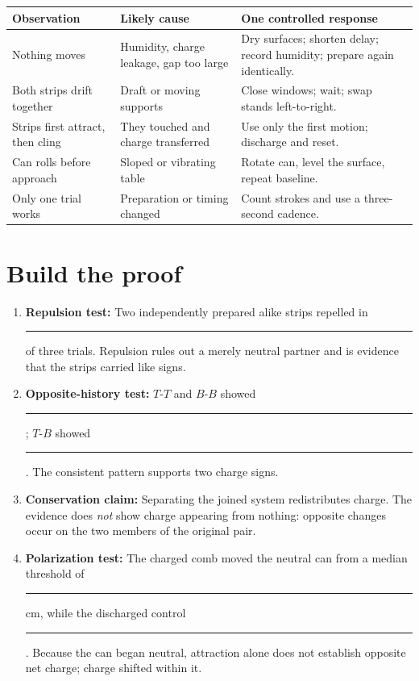 \begin{tabularx}{\linewidth}{@{}p{.24\linewidth}L L@{}}
\toprule
Observation & Likely cause & One controlled response\\
\midrule
Nothing moves & Humidity, charge leakage, gap too large & Dry surfaces; shorten
delay; record humidity; prepare again identically.\\
Both strips drift together & Draft or moving supports & Close windows; wait;
swap stands left-to-right.\\
Strips first attract, then cling & They touched and charge transferred & Use
only the first motion; discharge and reset.\\
Can rolls before approach & Sloped or vibrating table & Rotate can, level the
surface, repeat baseline.\\
Only one trial works & Preparation or timing changed & Count strokes and use a
three-second cadence.\\
\bottomrule
\end{tabularx}

\section{Build the proof}

\begin{enumerate}
  \item \textbf{Repulsion test:} Two independently prepared alike strips
    repelled in \rule{1cm}{.3pt} of three trials. Repulsion rules out a merely
    neutral partner and is evidence that the strips carried like signs.
  \item \textbf{Opposite-history test:} \(T\)-\(T\) and \(B\)-\(B\) showed
    \rule{2.1cm}{.3pt}; \(T\)-\(B\) showed \rule{2.1cm}{.3pt}. The consistent
    pattern supports two charge signs.
  \item \textbf{Conservation claim:} Separating the joined system redistributes
    charge. The evidence does \emph{not} show charge appearing from nothing:
    opposite changes occur on the two members of the original pair.
  \item \textbf{Polarization test:} The charged comb moved the neutral can from
    a median threshold of \rule{1cm}{.3pt} cm, while the discharged control
    \rule{2.5cm}{.3pt}. Because the can began neutral, attraction alone does not
    establish opposite net charge; charge shifted within it.
\end{enumerate}

